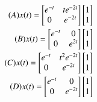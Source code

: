 \documentclass[journal,12pt,twocolumn]{IEEEtran}
\renewcommand\thesection{\arabic{section}}
\begin{document}
\begin{enumerate}[label=\arabic*.,ref=\thesection.\theenumi]
\begin{align}
(A) x(t) =
\begin{bmatrix}
e^{-t} & te^{-2t}\\
0 & e^{-2t}
\end{bmatrix}
\begin{bmatrix}
1\\
1
\end{bmatrix} 
\\
(B) x(t) =
\begin{bmatrix}
e^{-t} & 0\\
0 & e^{2t}
\end{bmatrix}
\begin{bmatrix}
1\\
1
\end{bmatrix}
\\
\vspace{3mm}
(C) x(t) =
\begin{bmatrix}
e^{-t} & t^{2}e^{-2t}\\
0 & e^{-2t}
\end{bmatrix}
\begin{bmatrix}
1\\
1
\end{bmatrix} 
\\ 
(D) x(t) =
\begin{bmatrix}
e^{-t} & 0\\
0 & e^{-2t}
\end{bmatrix}
\begin{bmatrix}
1\\
1
\end{bmatrix}
\\




\end{align}
\end{enumerate}
\end{document}

